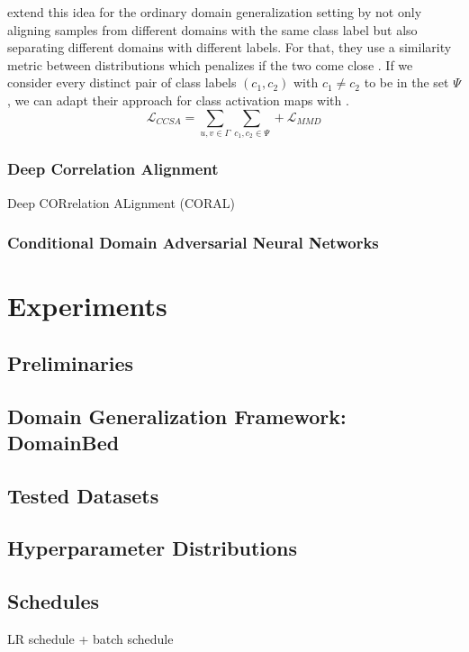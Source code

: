 \citet{MotiianPAD17} extend this idea for the ordinary domain generalization setting by not only aligning samples from different domains with the same class label but also separating different domains with different labels. For that, they use a similarity metric between distributions which penalizes if the two come close \citep{MotiianPAD17}. If we consider every distinct pair of class labels $(c_1,c_2)$ with $c_1 \neq c_2$ to be in the set $\Psi$, we can adapt their approach for class activation maps with .
\begin{equation}
\label{eq:separation}
    \mathcal{L}_{CCSA} =\sum_{u,v \in \Gamma}\sum_{c_1,c_2 \in \Psi} + \mathcal{L}_{MMD}
\end{equation}

\subsubsection{Deep Correlation Alignment}
Deep CORrelation ALignment (CORAL) \citep{SunS16}

\subsubsection{Conditional Domain Adversarial Neural Networks}

\section{Experiments}
\subsection{Preliminaries}
\subsection{Domain Generalization Framework: DomainBed}
\subsection{Tested Datasets}
\subsection{Hyperparameter Distributions}
\label{sec:ex_distributions}
\subsection{Schedules}
\label{sec:ex_schedules}
LR schedule + batch schedule

